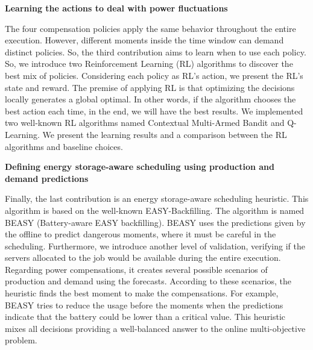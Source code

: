 \begin{center}
    \textbf{Learning the actions to deal with power fluctuations}
\end{center}
The four compensation policies apply the same behavior throughout the entire execution. However, different moments inside the time window can demand distinct policies. So, the third contribution aims to learn when to use each policy. So, we introduce two Reinforcement Learning (RL) algorithms to discover the best mix of policies. Considering each policy as RL's action, we present the RL's state and reward. The premise of applying RL is that optimizing the decisions locally generates a global optimal. In other words, if the algorithm chooses the best action each time, in the end, we will have the best results. We implemented two well-known RL algorithms named Contextual Multi-Armed Bandit and Q-Learning. We present the learning results and a comparison between the RL algorithms and baseline choices. 

\begin{center}
    \textbf{Defining energy storage-aware scheduling using production and demand predictions}
\end{center}

Finally, the last contribution is an energy storage-aware scheduling heuristic. This algorithm is based on the well-known EASY-Backfilling. The algorithm is named BEASY (Battery-aware EASY backfilling). BEASY uses the predictions given by the offline to predict dangerous moments, where it must be careful in the scheduling. Furthermore, we introduce another level of validation, verifying if the servers allocated to the job would be available during the entire execution. Regarding power compensations, it creates several possible scenarios of production and demand using the forecasts. According to these scenarios, the heuristic finds the best moment to make the compensations. For example, BEASY tries to reduce the usage before the moments when the predictions indicate that the battery could be lower than a critical value. This heuristic mixes all decisions providing a well-balanced answer to the online multi-objective problem.

